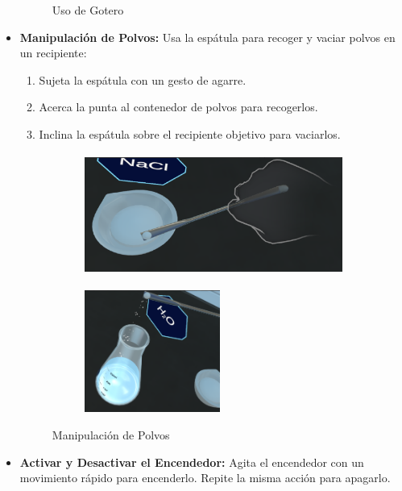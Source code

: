 \begin{itemize}
\begin{figure}[thbp]
        \caption{Uso de Gotero}
        \label{fig:Uso de Gotero}
    \end{figure}
    \item \textbf{Manipulación de Polvos:}  
    Usa la espátula para recoger y vaciar polvos en un recipiente:
    \begin{enumerate}
        \item Sujeta la espátula con un gesto de agarre.  
        \item Acerca la punta al contenedor de polvos para recogerlos.  
        \item Inclina la espátula sobre el recipiente objetivo para vaciarlos.  
    \end{enumerate}

    \begin{figure}[thbp]
            \centering
            \begin{subfigure}[b]{0.5\linewidth}
                \includegraphics[width=\linewidth, height = 4cm]{img/Interacciones/Polvos1.png}
            \end{subfigure}
            \begin{subfigure}[b]{0.3\linewidth}
                \includegraphics[width=\linewidth, height = 4cm]{img/Interacciones/Polvos2.png}
            \end{subfigure}
            \caption{Manipulación de Polvos}
        \end{figure}
    
    \item \textbf{Activar y Desactivar el Encendedor:}  
    Agita el encendedor con un movimiento rápido para encenderlo. Repite la misma acción para apagarlo.


\end{itemize}
